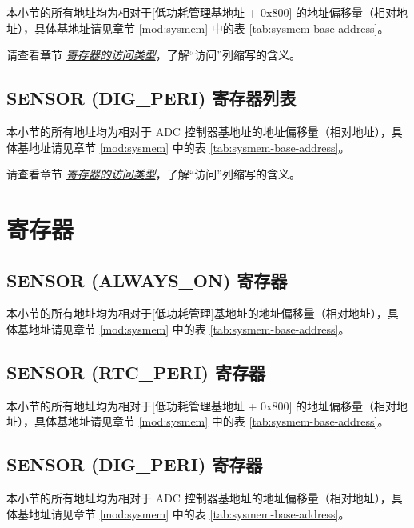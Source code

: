 \documentclass[main\_\_CN.tex]{subfiles}
\begin{document}
本小节的所有地址均为相对于[低功耗管理基地址 + 0x{}800] 的地址偏移量（相对地址），具体基地址请见章节 \ref{mod:sysmem} \textit{} 中的表 \ref{tab:sysmem-base-address}。

请查看章节 \hyperref[glossary-access-types]{\textit{寄存器的访问类型}}，了解“访问”列缩写的含义。



\subsection{SENSOR (DIG\_PERI) 寄存器列表}

本小节的所有地址均为相对于 ADC 控制器基地址的地址偏移量（相对地址），具体基地址请见章节 \ref{mod:sysmem} \textit{} 中的表 \ref{tab:sysmem-base-address}。

请查看章节 \hyperref[glossary-access-types]{\textit{寄存器的访问类型}}，了解“访问”列缩写的含义。




\section{寄存器}
\label{section:registers}

\subsection{SENSOR (ALWAYS\_ON) 寄存器}

本小节的所有地址均为相对于[低功耗管理]基地址的地址偏移量（相对地址），具体基地址请见章节 \ref{mod:sysmem} \textit{} 中的表 \ref{tab:sysmem-base-address}。



\subsection{SENSOR (RTC\_PERI) 寄存器}

本小节的所有地址均为相对于[低功耗管理基地址 + 0x{}800] 的地址偏移量（相对地址），具体基地址请见章节 \ref{mod:sysmem} \textit{} 中的表 \ref{tab:sysmem-base-address}。


\subsection{SENSOR (DIG\_PERI) 寄存器}

本小节的所有地址均为相对于 ADC 控制器基地址的地址偏移量（相对地址），具体基地址请见章节 \ref{mod:sysmem} \textit{} 中的表 \ref{tab:sysmem-base-address}。

\end{document}
